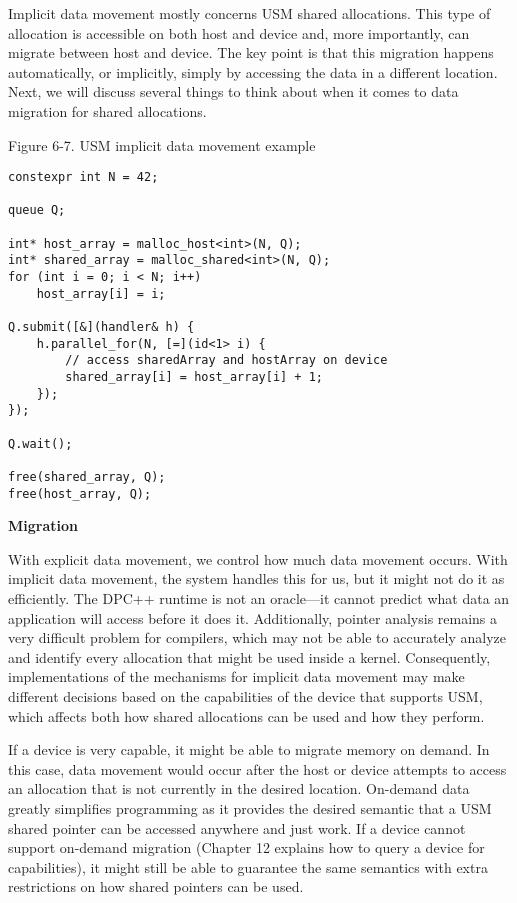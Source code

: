 Implicit data movement mostly concerns USM shared allocations. This type of allocation is accessible on both host and device and, more importantly, can migrate between host and device. The key point is that this migration happens automatically, or implicitly, simply by accessing the data in a different location. Next, we will discuss several things to think about when it comes to data migration for shared allocations.\par

\hspace*{\fill} \par %
Figure 6-7. USM implicit data movement example
\begin{lstlisting}[caption={}]
constexpr int N = 42;

queue Q;

int* host_array = malloc_host<int>(N, Q);
int* shared_array = malloc_shared<int>(N, Q);
for (int i = 0; i < N; i++)
	host_array[i] = i;
	
Q.submit([&](handler& h) {
	h.parallel_for(N, [=](id<1> i) {
		// access sharedArray and hostArray on device
		shared_array[i] = host_array[i] + 1;
	});
});

Q.wait();

free(shared_array, Q);
free(host_array, Q);
\end{lstlisting}

\hspace*{\fill} \par %
\textbf{Migration}

With explicit data movement, we control how much data movement occurs. With implicit data movement, the system handles this for us, but it might not do it as efficiently. The DPC++ runtime is not an oracle—it cannot predict what data an application will access before it does it. Additionally, pointer analysis remains a very difficult problem for compilers, which may not be able to accurately analyze and identify every allocation that might be used inside a kernel. Consequently, implementations of the mechanisms for implicit data movement may make different decisions based on the capabilities of the device that supports USM, which affects both how shared allocations can be used and how they perform.\par

If a device is very capable, it might be able to migrate memory on demand. In this case, data movement would occur after the host or device attempts to access an allocation that is not currently in the desired location. On-demand data greatly simplifies programming as it provides the desired semantic that a USM shared pointer can be accessed anywhere and just work. If a device cannot support on-demand migration (Chapter 12 explains how to query a device for capabilities), it might still be able to guarantee the same semantics with extra restrictions on how shared pointers can be used.\par

